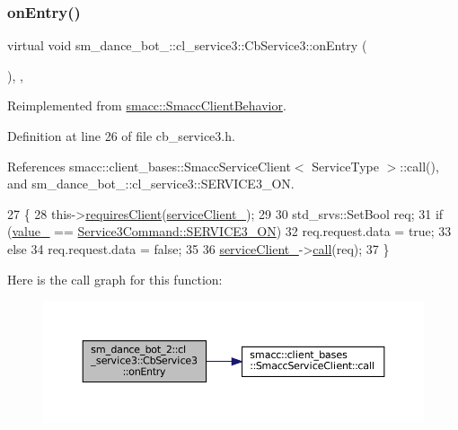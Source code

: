 \subsubsection{\texorpdfstring{on\+Entry()}{onEntry()}}
{\footnotesize\ttfamily virtual void sm\+\_\+dance\+\_\+bot\+\_\+::cl\+\_\+service3\+::\+Cb\+Service3\+::on\+Entry (\begin{DoxyParamCaption}{ }\end{DoxyParamCaption})\hspace{0.3cm}{\ttfamily [inline]}, {\ttfamily [override]}, {\ttfamily [virtual]}}



Reimplemented from \hyperlink{classsmacc_1_1SmaccClientBehavior_ad5d3e1f1697c3cfe66c94cadba948493}{smacc\+::\+Smacc\+Client\+Behavior}.



Definition at line 26 of file cb\+\_\+service3.\+h.



References smacc\+::client\+\_\+bases\+::\+Smacc\+Service\+Client$<$ Service\+Type $>$\+::call(), and sm\+\_\+dance\+\_\+bot\+\_\+::cl\+\_\+service3\+::\+S\+E\+R\+V\+I\+C\+E3\+\_\+\+ON.


\begin{DoxyCode}
27   \{
28     this->\hyperlink{classsmacc_1_1ISmaccClientBehavior_a32b16e99e3b4cb289414203dc861a440}{requiresClient}(\hyperlink{classsm__dance__bot__2_1_1cl__service3_1_1CbService3_ac5fafa2528bba4c7411816dde044c48a}{serviceClient\_});
29 
30     std\_srvs::SetBool req;
31     \textcolor{keywordflow}{if} (\hyperlink{classsm__dance__bot__2_1_1cl__service3_1_1CbService3_ae48a64bc675b548fcb9c059831e39e37}{value\_} == \hyperlink{namespacesm__dance__bot__2_1_1cl__service3_adfc3ce70a327b24b4fb6d6b02803caffa13cdca48a01bbb44fa8fb35567fbc58e}{Service3Command::SERVICE3\_ON})
32       req.request.data = \textcolor{keyword}{true};
33     \textcolor{keywordflow}{else}
34       req.request.data = \textcolor{keyword}{false};
35 
36     \hyperlink{classsm__dance__bot__2_1_1cl__service3_1_1CbService3_ac5fafa2528bba4c7411816dde044c48a}{serviceClient\_}->\hyperlink{classsmacc_1_1client__bases_1_1SmaccServiceClient_a0e9914f45f1091c38bb9ad6187d07977}{call}(req);
37   \}
\end{DoxyCode}
Here is the call graph for this function\+:
\nopagebreak
\begin{figure}[H]
\begin{center}
\leavevmode
\includegraphics[width=350pt]{classsm__dance__bot__2_1_1cl__service3_1_1CbService3_a179e43cc240f53f9c49c67094e41d75f_cgraph}
\end{center}
\end{figure}


